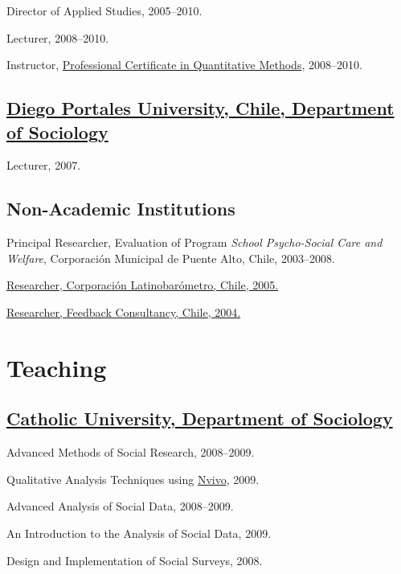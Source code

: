 \documentclass[10pt,letterpaper]{article}
\renewenvironment{itemize}{
  \begin{list}{}{
    \setlength{\leftmargin}{1.5em}
    \setlength{\itemsep}{0.25em}
    \setlength{\parskip}{0pt}
    \setlength{\parsep}{0.25em}
  }
}{
  \end{list}
}
\begin{document}
 \begin{itemize}
 \item Director of Applied Studies, 2005--2010.
 \item Lecturer, 2008--2010.
 \item Instructor, \href{http://www.educacioncontinua.uc.cl}{Professional Certificate in Quantitative Methods}, 2008--2010.
 \end{itemize}

\subsection*{\href{http://www.udp.cl/facultades_carreras/ciencias_sociales-historia/}{Diego Portales University, Chile, Department of Sociology}}

\begin{itemize}
\item Lecturer, 2007.
\end{itemize}


\subsection*{Non-Academic Institutions}

\begin{itemize}
\item Principal Researcher, Evaluation of Program \textit{School Psycho-Social Care and Welfare}, Corporación Municipal de Puente Alto, Chile, 2003--2008.
\item \href{http://www.latinobarometro.org}{Researcher, Corporación Latinobarómetro, Chile, 2005.}
\item \href{http://www.feedback.cl}{Researcher, Feedback Consultancy, Chile, 2004.}
\end{itemize}


\section*{Teaching}

\subsection*{\href{http://sociologia.uc.cl/}{Catholic University, Department of Sociology}}

\begin{itemize}
\item Advanced Methods of Social Research, 2008--2009.
\item Qualitative Analysis Techniques using \href{http://www.qsrinternational.com/}{Nvivo}, 2009.
\item Advanced Analysis of Social Data, 2008--2009.
\item An Introduction to the Analysis of Social Data, 2009.
\item Design and Implementation of Social Surveys, 2008.
\end{itemize}
\end{document}
